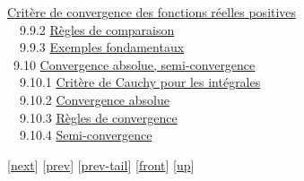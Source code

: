 \documentclass[]{article}
\begin{document}
\href{coursse58.html\#x70-3080009.9.1}{Critère de convergence des
fonctions réelles positives} \\ ~~9.9.2
\href{coursse58.html\#x70-3090009.9.2}{Règles de comparaison} \\ ~~9.9.3
\href{coursse58.html\#x70-3100009.9.3}{Exemples fondamentaux} \\ ~9.10
\href{coursse59.html\#x71-3110009.10}{Convergence absolue,
semi-convergence} \\ ~~9.10.1
\href{coursse59.html\#x71-3120009.10.1}{Critère de Cauchy pour les
intégrales} \\ ~~9.10.2
\href{coursse59.html\#x71-3130009.10.2}{Convergence absolue} \\ ~~9.10.3
\href{coursse59.html\#x71-3140009.10.3}{Règles de convergence} \\
~~9.10.4 \href{coursse59.html\#x71-3150009.10.4}{Semi-convergence}

{[}\href{coursch11.html}{next}{]} {[}\href{coursch9.html}{prev}{]}
{[}\href{coursch9.html\#tailcoursch9.html}{prev-tail}{]}
{[}\href{coursch10.html}{front}{]}
{[}\href{cours.html\#coursch10.html}{up}{]}
\end{document}
